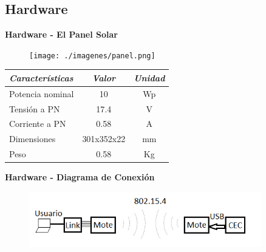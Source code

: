 \documentclass[aspectratio=43, handout]{beamer}
\begin{document}
\subsection[Hardware]{Hardware}
\begin{frame}{\textbf{\LARGE{Hardware - El Panel Solar}}}
\begin{center}
			\begin{figure}[H]
			\texttt{[image: ./imagenes/panel.png]}
		\end{figure}	
	\vspace{10px}	
	\begin{tabular}{@{} l *2c @{}}    %
		\hline
		\emph{\textbf{Características}} & \emph{\textbf{Valor}} & \emph{\textbf{Unidad}}\\
		\hline
		Potencia nominal	& 10 	& Wp	\\	
		Tensión a PN		& 17.4	& V\\
		Corriente a PN	& 0.58		& A\\
		Dimensiones		& 301x352x22 	& mm\\
		Peso				& 0.58		& Kg	\\
		\hline
	\end{tabular}
\end{center}
\end{frame}


\begin{frame}{\textbf{\LARGE{Hardware - Diagrama de Conexión}}}
		\begin{figure}[H]
			\includegraphics[width=0.9\textwidth]{./imagenes/conex.png}
		\end{figure}	
\end{frame}
\end{document}
